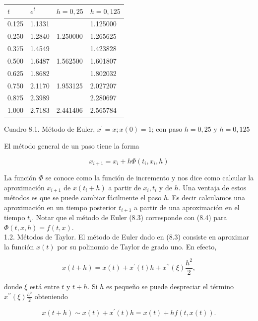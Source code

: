 \documentclass[10pt]{article}
\begin{document}
\begin{center}
\begin{tabular}{|l|l|l|l|}
\hline
$t$ & $e^{t}$ & $h=0,25$ & $h=0,125$ \\
\hline
0.125 & 1.1331 &  & 1.125000 \\
0.250 & 1.2840 & 1.250000 & 1.265625 \\
0.375 & 1.4549 &  & 1.423828 \\
0.500 & 1.6487 & 1.562500 & 1.601807 \\
0.625 & 1.8682 &  & 1.802032 \\
0.750 & 2.1170 & 1.953125 & 2.027207 \\
0.875 & 2.3989 &  & 2.280697 \\
1.000 & 2.7183 & 2.441406 & 2.565784 \\
\hline
\end{tabular}
\end{center}

Cuadro 8.1. Método de Euler, $x^{\prime}=x ; x(0)=1$; con paso $h=0,25$ y $h=0,125$

El método general de un paso tiene la forma


\begin{equation*}
x_{i+1}=x_{i}+h \Phi\left(t_{i}, x_{i}, h\right) \tag{8.4}
\end{equation*}


La función $\Phi$ se conoce como la función de incremento y nos dice como calcular la aproximación $x_{i+1}$ de $x\left(t_{i}+h\right)$ a partir de $x_{i}, t_{i}$ y de $h$. Una ventaja de estos métodos es que se puede cambiar fácilmente el paso $h$. Es decir calculamos una aproximación en un tiempo posterior $t_{i+1}$ a partir de una aproximación en el tiempo $t_{i}$. Notar que el método de Euler (8.3) corresponde con (8.4) para $\Phi(t, x, h)=f(t, x)$.\\
1.2. Métodos de Taylor. El método de Euler dado en (8.3) consiste en aproximar la función $x(t)$ por su polinomio de Taylor de grado uno. En efecto,

$$
x(t+h)=x(t)+x^{\prime}(t) h+x^{\prime \prime}(\xi) \frac{h^{2}}{2},
$$

donde $\xi$ está entre $t$ y $t+h$. Si $h$ es pequeño se puede despreciar el término $x^{\prime \prime}(\xi) \frac{h^{2}}{2}$ obteniendo


\begin{equation*}
x(t+h) \sim x(t)+x^{\prime}(t) h=x(t)+h f(t, x(t)) . \tag{8.5}
\end{equation*}
\end{document}
